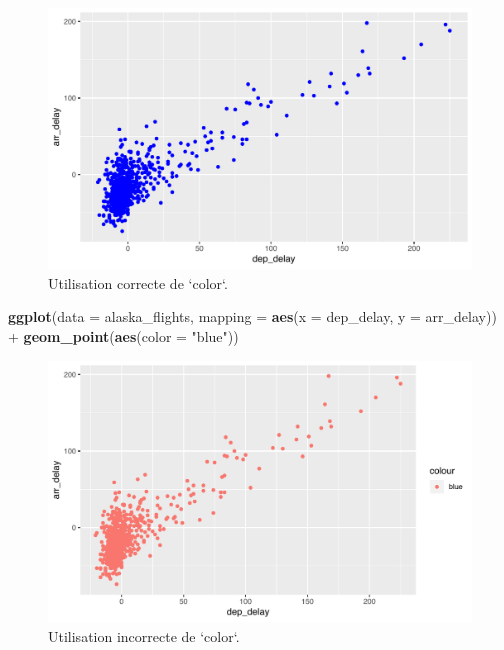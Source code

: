 \documentclass[a4paperpaper,]{article}
\newenvironment{Shaded}{\begin{snugshade}}{\end{snugshade}}
\newcommand{\DataTypeTok}[1]{\textcolor[rgb]{0.00,0.34,0.68}{#1}}
\newcommand{\KeywordTok}[1]{\textcolor[rgb]{0.12,0.11,0.11}{\textbf{#1}}}
\newcommand{\NormalTok}[1]{\textcolor[rgb]{0.12,0.11,0.11}{#1}}
\newcommand{\OperatorTok}[1]{\textcolor[rgb]{0.12,0.11,0.11}{#1}}
\newcommand{\StringTok}[1]{\textcolor[rgb]{0.75,0.01,0.01}{#1}}
\begin{document}
\begin{figure}[htpb]

{\centering \includegraphics[width=0.9\linewidth]{figure/rightcolor-1} 

}

\caption{Utilisation correcte de `color`.}\label{fig:rightcolor}
\end{figure}

\begin{Shaded}
\begin{Highlighting}[]
\KeywordTok{ggplot}\NormalTok{(}\DataTypeTok{data =}\NormalTok{ alaska_flights, }\DataTypeTok{mapping =} \KeywordTok{aes}\NormalTok{(}\DataTypeTok{x =}\NormalTok{ dep_delay, }\DataTypeTok{y =}\NormalTok{ arr_delay)) }\OperatorTok{+}
\StringTok{  }\KeywordTok{geom_point}\NormalTok{(}\KeywordTok{aes}\NormalTok{(}\DataTypeTok{color =} \StringTok{"blue"}\NormalTok{))}
\end{Highlighting}
\end{Shaded}

\begin{figure}[htpb]

{\centering \includegraphics[width=0.9\linewidth]{figure/wrongcolor-1} 

}

\caption{Utilisation incorrecte de `color`.}\label{fig:wrongcolor}
\end{figure}
\end{document}
